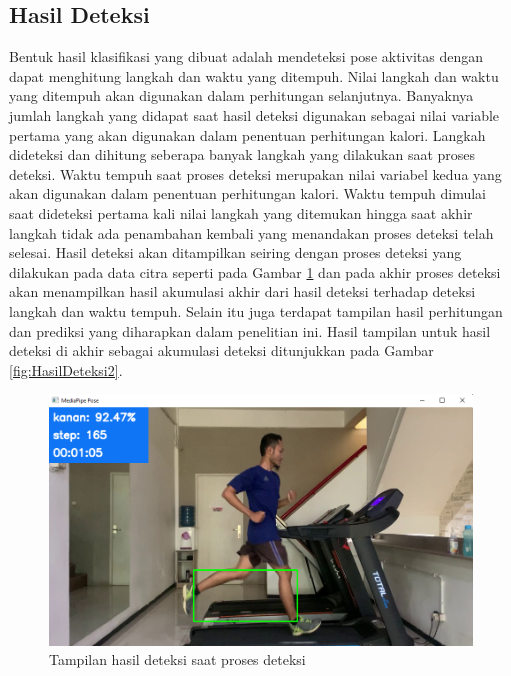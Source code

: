 \subsection{Hasil Deteksi}
\label{subsec:HasilDeteksi}

Bentuk hasil klasifikasi yang dibuat adalah mendeteksi pose aktivitas dengan dapat menghitung langkah dan waktu yang ditempuh. Nilai langkah dan waktu yang ditempuh akan digunakan dalam perhitungan selanjutnya. Banyaknya jumlah langkah yang didapat saat hasil deteksi digunakan sebagai nilai variable pertama yang akan digunakan dalam penentuan perhitungan kalori. Langkah dideteksi dan dihitung seberapa banyak langkah yang dilakukan saat proses deteksi. Waktu tempuh saat proses deteksi merupakan nilai variabel kedua yang akan digunakan dalam penentuan perhitungan kalori. Waktu tempuh dimulai saat dideteksi pertama kali nilai langkah yang ditemukan hingga saat akhir langkah tidak ada penambahan kembali yang menandakan proses deteksi telah selesai. Hasil deteksi akan ditampilkan seiring dengan proses deteksi yang dilakukan pada data citra seperti pada Gambar \ref{fig:HasilDeteksi} dan pada akhir proses deteksi akan menampilkan hasil akumulasi akhir dari hasil deteksi terhadap deteksi langkah dan waktu tempuh. Selain itu juga terdapat tampilan hasil perhitungan dan prediksi yang diharapkan dalam penelitian ini. Hasil tampilan untuk hasil deteksi di akhir sebagai akumulasi deteksi ditunjukkan pada Gambar \ref{fig:HasilDeteksi2}.

\begin{figure}[H]
  \centering
  \includegraphics[scale=0.48]{gambar/hasil deteksi.png}
  \caption{Tampilan hasil deteksi saat proses deteksi}
  \label{fig:HasilDeteksi}
\end{figure}

